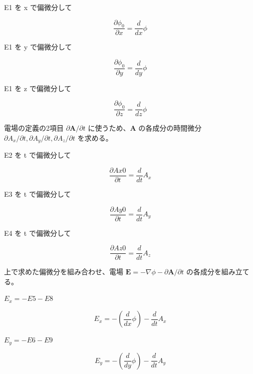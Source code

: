 \documentclass[dvipdfmx,a4paper,11pt]{jsarticle}
\begin{document}
E1 を x で偏微分して

\begin{equation}
  \frac{\partial \phi_{0}}{\partial x} = \frac{d}{d x} \phi
  \label{eq:E5}
\end{equation}

E1 を y で偏微分して

\begin{equation}
  \frac{\partial \phi_{0}}{\partial y} = \frac{d}{d y} \phi
  \label{eq:E6}
\end{equation}

E1 を z で偏微分して

\begin{equation}
  \frac{\partial \phi_{0}}{\partial z} = \frac{d}{d z} \phi
  \label{eq:E7}
\end{equation}

電場の定義の2項目 $\partial\mathbf A/\partial t$ に使うため、$\mathbf A$ の各成分の時間微分 $\partial A_x/\partial t,\partial A_y/\partial t,\partial A_z/\partial t$ を求める。

E2 を t で偏微分して

\begin{equation}
  \frac{\partial Ax0}{\partial t} = \frac{d}{d t} A_{x}
  \label{eq:E8}
\end{equation}

E3 を t で偏微分して

\begin{equation}
  \frac{\partial Ay0}{\partial t} = \frac{d}{d t} A_{y}
  \label{eq:E9}
\end{equation}

E4 を t で偏微分して

\begin{equation}
  \frac{\partial Az0}{\partial t} = \frac{d}{d t} A_{z}
  \label{eq:E10}
\end{equation}

上で求めた偏微分を組み合わせ、電場 $\mathbf E=-\nabla\phi-\partial\mathbf A/\partial t$ の各成分を組み立てる。

$E_x = -E5 - E8$

\begin{equation}
  E_x = -\left(\frac{d}{d x} \phi\right)-\frac{d}{d t} A_{x}
  \label{eq:E11}
\end{equation}

$E_y = -E6 - E9$

\begin{equation}
  E_y = -\left(\frac{d}{d y} \phi\right)-\frac{d}{d t} A_{y}
  \label{eq:E12}
\end{equation}
\end{document}
